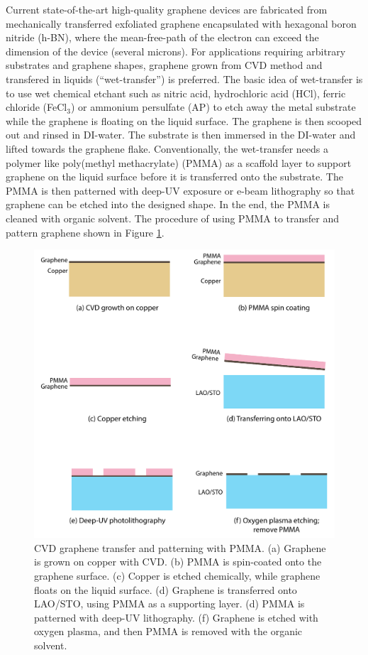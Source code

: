\documentclass[pdflatex, sectionletters, 12pt]{pittetd}    %
\begin{document}
Current state-of-the-art high-quality graphene devices are fabricated from mechanically transferred exfoliated graphene encapsulated with hexagonal boron nitride (h-BN)\cite{dean2010naturenano}, where the mean-free-path of the electron can exceed the dimension of the device\cite{Novoselovaac9439} (several microns). For applications requiring arbitrary substrates and graphene shapes, graphene grown from CVD method and transfered in liquids (``wet-transfer'') is preferred. The basic idea of wet-transfer is to use wet chemical etchant such as nitric acid, hydrochloric acid (HCl), ferric chloride (FeCl$_3$) or ammonium persulfate (AP) to etch away the metal substrate while the graphene is floating on the liquid surface. The graphene is then scooped out and rinsed in DI-water. The substrate is then immersed in the DI-water and lifted towards the graphene flake. Conventionally, the wet-transfer needs a polymer like poly(methyl methacrylate) (PMMA) as a scaffold layer to support graphene on the liquid surface before it is transferred onto the substrate\cite{li2009transfer, reina2008transferring, reina2008large}. The PMMA is then patterned with deep-UV exposure or e-beam lithography so that graphene can be etched into the designed shape. In the end, the PMMA is cleaned with organic solvent. The procedure of using PMMA to transfer and pattern graphene shown in Figure \ref{FIG:PMMATransfer}. 

\begin{figure}[p]
	\centering
	\includegraphics[width=.90\textwidth]{Drawing/PMMATransfer.pdf}
	\caption{CVD graphene transfer and patterning with PMMA. (a) Graphene is grown on copper with CVD. (b) PMMA is spin-coated onto the graphene surface. (c) Copper is etched chemically, while graphene floats on the liquid surface. (d) Graphene is transferred onto LAO/STO, using PMMA as a supporting layer. (d) PMMA is patterned with deep-UV lithography. (f) Graphene is etched with oxygen plasma, and then PMMA is removed with the organic solvent.}
	\label{FIG:PMMATransfer}
\end{figure}
\end{document}
